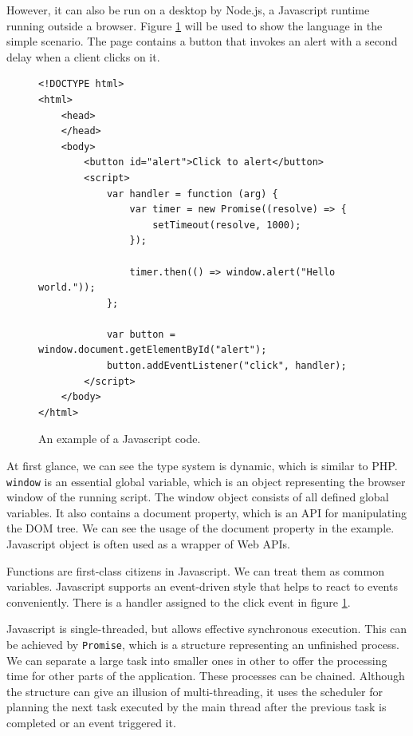 However, it can also be run on a desktop by Node.js, a Javascript runtime running outside a browser.
Figure \ref{img02:javascript} will be used to show the language in the simple scenario.
The page contains a button that invokes an alert with a second delay when a client clicks on it.
\par
\begin{figure}
\begin{lstlisting}
<!DOCTYPE html>
<html>
    <head>
    </head>
    <body>
        <button id="alert">Click to alert</button>
        <script>
            var handler = function (arg) {
                var timer = new Promise((resolve) => {
                    setTimeout(resolve, 1000);
                }); 
        
                timer.then(() => window.alert("Hello world."));
            };  

            var button = window.document.getElementById("alert");
            button.addEventListener("click", handler);
        </script>
    </body>
</html>
\end{lstlisting}
\caption{An example of a Javascript code.}
\label{img02:javascript}
\end{figure}
\par
At first glance, we can see the type system is dynamic, which is similar to PHP.
\texttt{window} is an essential global variable, which is an object representing the browser window of the running script.
The window object consists of all defined global variables.
It also contains a document property, which is an API for manipulating the DOM tree.
We can see the usage of the document property in the example.
Javascript object is often used as a wrapper of Web APIs.
\par
Functions are first-class citizens in Javascript.
We can treat them as common variables.
Javascript supports an event-driven style that helps to react to events conveniently.
There is a handler assigned to the click event in figure \ref{img02:javascript}.
\par
Javascript is single-threaded, but allows effective synchronous execution.
This can be achieved by \texttt{Promise}, which is a structure representing an unfinished process.
We can separate a large task into smaller ones in other to offer the processing time for other parts of the application.
These processes can be chained.
Although the structure can give an illusion of multi-threading, it uses the scheduler for planning the next task executed by the main thread after the previous task is completed or an event triggered it.
